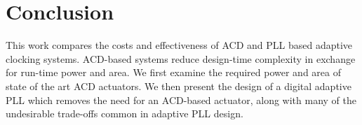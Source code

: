 \documentclass[twoside,9pt,journal,letterpage]{IEEEtran}
\begin{document}
\section{Conclusion}
\label{sec:conclusion}

This work compares the costs and effectiveness of ACD and PLL based adaptive clocking systems. ACD-based systems reduce design-time complexity in exchange for run-time power and area. We first examine the required power and area of state of the art ACD actuators. We then present the design of a digital adaptive PLL which removes the need for an ACD-based actuator, along with many of the undesirable trade-offs common in adaptive PLL design.



\begingroup
\raggedright

\endgroup
\end{document}
